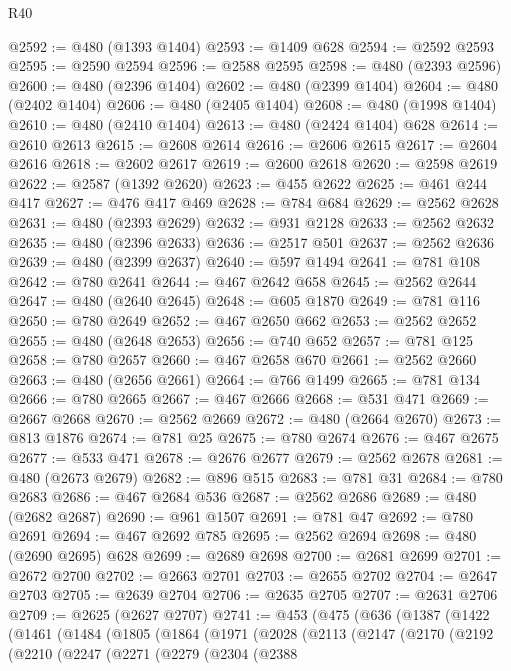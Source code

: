 \begin{lexlean}{R40}
\begin{coremodule}
{{{{{{{{{{{{{{{{{{{{{{{{{{{{{{{{{{{{{{{{{{{{{{{{{{{{{{{{{{{{{{{{{{{{{{{{{{{{{{{{{{{{{{{{{{{{{{{{{{{{{{{{{{{{{@2592 := @480 (@1393 @1404)
@2593 := @1409 @628
@2594 := @2592 @2593
@2595 := @2590 @2594
@2596 := @2588 @2595
@2598 := @480 (@2393 @2596)
@2600 := @480 (@2396 @1404)
@2602 := @480 (@2399 @1404)
@2604 := @480 (@2402 @1404)
@2606 := @480 (@2405 @1404)
@2608 := @480 (@1998 @1404)
@2610 := @480 (@2410 @1404)
@2613 := @480 (@2424 @1404) @628
@2614 := @2610 @2613
@2615 := @2608 @2614
@2616 := @2606 @2615
@2617 := @2604 @2616
@2618 := @2602 @2617
@2619 := @2600 @2618
@2620 := @2598 @2619
@2622 := @2587 (@1392 @2620)
@2623 := @455 @2622
@2625 := @461 @244 @417
@2627 := @476 @417 @469
@2628 := @784 @684
@2629 := @2562 @2628
@2631 := @480 (@2393 @2629)
@2632 := @931 @2128
@2633 := @2562 @2632
@2635 := @480 (@2396 @2633)
@2636 := @2517 @501
@2637 := @2562 @2636
@2639 := @480 (@2399 @2637)
@2640 := @597 @1494
@2641 := @781 @108
@2642 := @780 @2641
@2644 := @467 @2642 @658
@2645 := @2562 @2644
@2647 := @480 (@2640 @2645)
@2648 := @605 @1870
@2649 := @781 @116
@2650 := @780 @2649
@2652 := @467 @2650 @662
@2653 := @2562 @2652
@2655 := @480 (@2648 @2653)
@2656 := @740 @652
@2657 := @781 @125
@2658 := @780 @2657
@2660 := @467 @2658 @670
@2661 := @2562 @2660
@2663 := @480 (@2656 @2661)
@2664 := @766 @1499
@2665 := @781 @134
@2666 := @780 @2665
@2667 := @467 @2666
@2668 := @531 @471
@2669 := @2667 @2668
@2670 := @2562 @2669
@2672 := @480 (@2664 @2670)
@2673 := @813 @1876
@2674 := @781 @25
@2675 := @780 @2674
@2676 := @467 @2675
@2677 := @533 @471
@2678 := @2676 @2677
@2679 := @2562 @2678
@2681 := @480 (@2673 @2679)
@2682 := @896 @515
@2683 := @781 @31
@2684 := @780 @2683
@2686 := @467 @2684 @536
@2687 := @2562 @2686
@2689 := @480 (@2682 @2687)
@2690 := @961 @1507
@2691 := @781 @47
@2692 := @780 @2691
@2694 := @467 @2692 @785
@2695 := @2562 @2694
@2698 := @480 (@2690 @2695) @628
@2699 := @2689 @2698
@2700 := @2681 @2699
@2701 := @2672 @2700
@2702 := @2663 @2701
@2703 := @2655 @2702
@2704 := @2647 @2703
@2705 := @2639 @2704
@2706 := @2635 @2705
@2707 := @2631 @2706
@2709 := @2625 (@2627 @2707)
@2741 := @453
    (@475
      (@636
        (@1387
          (@1422
            (@1461
              (@1484
                (@1805
                  (@1864
                    (@1971
                      (@2028
                        (@2113
                          (@2147
                            (@2170
                              (@2192
                                (@2210
                                  (@2247
                                    (@2271
                                      (@2279
                                        (@2304
                                          (@2388
}}}}}}}}}}}}}}}}}}}}}}}}}}}}}}}}}}}}}}}}}}}}}}}}}}}}}}}}}}}}}}}}}}}}}}}}}}}}}}}}}}}}}}}}}}}}}}}}}}}}}}}}}}}}}
\end{coremodule}
\end{lexlean}
